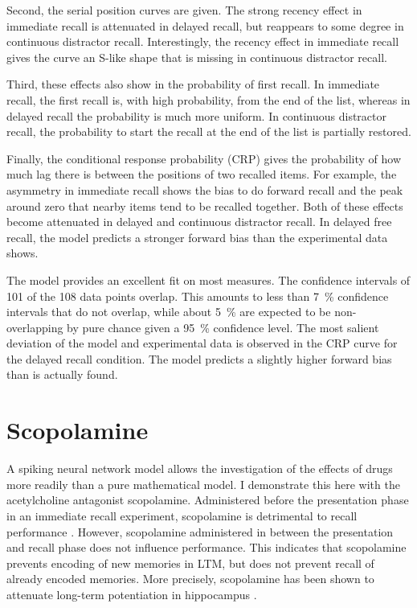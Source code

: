 Second, the serial position curves are given.
The strong recency effect in immediate recall is attenuated in delayed recall, but reappears to some degree in continuous distractor recall.
Interestingly, the recency effect in immediate recall gives the curve an S-like shape that is missing in continuous distractor recall.

Third, these effects also show in the probability of first recall.
In immediate recall, the first recall is, with high probability, from the end of the list, whereas in delayed recall the probability is much more uniform.
In continuous distractor recall, the probability to start the recall at the end of the list is partially restored.

Finally, the conditional response probability (CRP) gives the probability of how much lag there is between the positions of two recalled items.
For example, the asymmetry in immediate recall shows the bias to do forward recall and the peak around zero that nearby items tend to be recalled together.
Both of these effects become attenuated in delayed and continuous distractor recall.
In delayed free recall, the model predicts a stronger forward bias than the experimental data shows.

The model provides an excellent fit on most measures.
The confidence intervals of \num{101} of the \num{108} data points overlap.
This amounts to less than \SI{7}{\percent} confidence intervals that do not overlap, while about \SI{5}{\percent} are expected to be non-overlapping by pure chance given a \SI{95}{\percent} confidence level.
The most salient deviation of the model and experimental data is observed in the CRP curve for the delayed recall condition.
The model predicts a slightly higher forward bias than is actually found.


\section{Scopolamine}
A spiking neural network model allows the investigation of the effects of drugs more readily than a pure mathematical model.
I demonstrate this here with the acetylcholine antagonist scopolamine.
Administered before the presentation phase in an immediate recall experiment, scopolamine is detrimental to recall performance \parencite{ghoneim1975}.
However, scopolamine administered in between the presentation and recall phase does not influence performance.
This indicates that scopolamine prevents encoding of new memories in LTM, but does not prevent recall of already encoded memories.
More precisely, scopolamine has been shown to attenuate long-term potentiation in hippocampus \parencite{leung2003,ito1988,hirotsu1989-1}.


